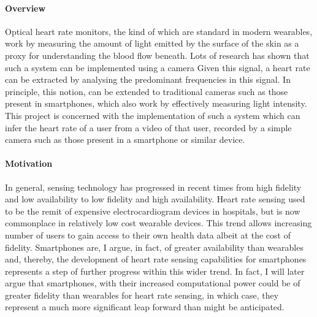 \paragraph{Overview}
Optical heart rate monitors, the kind of which are standard in modern wearables, work by measuring the amount of light emitted by the surface of the skin 
as a proxy for understanding the blood flow beneath.
Lots of research has shown that such a system can be implemented using a camera 
Given this signal, a heart rate can be extracted by analysing the predominant frequencies in this signal. In principle, 
this notion, can be extended to traditional cameras such as those present in smartphones, which also work by effectively measuring light intensity.
This project is concerned with the implementation of such a system which can infer the heart rate of a user from a video of that user, recorded by a simple camera such as those
present in a smartphone or similar device.

\paragraph{Motivation}
In general, sensing technology has progressed in recent times from high fidelity and low availability to low fidelity and high availability.
Heart rate sensing used to be the remit of expensive electrocardiogram devices in hospitals, but is now commonplace in relatively low cost wearable devices.
This trend allows increasing number of users to gain access to their own health data albeit at the cost of fidelity.
Smartphones are, I argue, in fact, of greater availability than wearables and, thereby, the development of heart rate sensing capabilities for 
smartphones represents a step of further progress within this wider trend. 
In fact, I will later argue that smartphones, with their increased computational power 
could be of greater fidelity than wearables for heart rate sensing, in which case, they represent a much more significant 
leap forward than might be anticipated.
